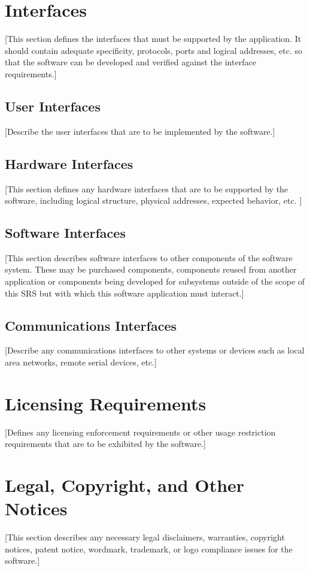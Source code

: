 \documentclass[a4paper,12pt,chapterprefix=false,bibliography=totoc,listof=totoc]{scrreprt}
\begin{document}
\section{Interfaces}
[This section defines the interfaces that must be supported by the application. It should contain adequate specificity, protocols, ports and logical addresses, etc. so that the software can be developed and verified against the interface requirements.]

\subsection{User Interfaces}
[Describe the user interfaces that are to be implemented by the software.]

\subsection{Hardware Interfaces}
[This section defines any hardware interfaces that are to be supported by the software, including logical structure, physical addresses, expected behavior, etc. ]

\subsection{Software Interfaces}
[This section describes software interfaces to other components of the software system. These may be purchased components, components reused from another application or components being developed for subsystems outside of the scope of this SRS but with which this software application must interact.]

\subsection{Communications Interfaces}
[Describe any communications interfaces to other systems or devices such as local area networks, remote serial devices, etc.]

\section{Licensing Requirements}
[Defines any licensing enforcement requirements or other usage restriction requirements that are to be exhibited by the software.]

\section{Legal, Copyright, and Other Notices}
[This section describes any necessary legal disclaimers, warranties, copyright notices, patent notice, wordmark, trademark, or logo compliance issues for the software.]
\end{document}

